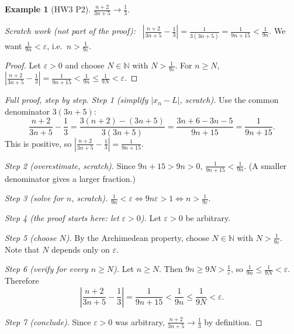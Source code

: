 \documentclass[11pt]{article}
\theoremstyle{definition}
\newtheorem{ex}[defn]{Example}
\newcommand{\N}{\mathbb{N}}
\newcommand{\eps}{\varepsilon}
\newenvironment{scratch}{\par\medskip\noindent\textit{Scratch work (not part of the proof):}\ }{\par\medskip}
\begin{document}
\begin{ex}[HW3 P2]
$\frac{n+2}{3n+5}\to\frac13$.
\begin{scratch}
$\left|\frac{n+2}{3n+5}-\frac13\right|=\frac{1}{3(3n+5)}=\frac1{9n+15}<\frac1{9n}$.
We want $\frac1{9n}<\eps$, i.e.\ $n>\frac1{9\eps}$.
\end{scratch}
\begin{proof}
Let $\eps>0$ and choose $N\in\N$ with $N>\frac{1}{9\eps}$. For $n\ge N$,
$\left|\frac{n+2}{3n+5}-\frac13\right|=\frac1{9n+15}<\frac1{9n}\le\frac1{9N}<\eps$.
\end{proof}

\begin{proof}[Full proof, step by step]
\emph{Step 1 (simplify $|x_n-L|$, scratch).} Use the common denominator
$3(3n+5)$:
\[
\frac{n+2}{3n+5}-\frac13=\frac{3(n+2)-(3n+5)}{3(3n+5)}=\frac{3n+6-3n-5}{9n+15}
=\frac1{9n+15}.
\]
This is positive, so $\left|\frac{n+2}{3n+5}-\frac13\right|=\frac1{9n+15}$.

\emph{Step 2 (overestimate, scratch).} Since $9n+15>9n>0$,
$\frac1{9n+15}<\frac1{9n}$. (A smaller denominator gives a larger fraction.)

\emph{Step 3 (solve for $n$, scratch).}
$\frac1{9n}<\eps\iff9n\eps>1\iff n>\frac1{9\eps}$.

\emph{Step 4 (the proof starts here: let $\eps>0$).} Let $\eps>0$ be
arbitrary.

\emph{Step 5 (choose $N$).} By the Archimedean property, choose
$N\in\N$ with $N>\frac1{9\eps}$. Note that $N$ depends only on $\eps$.

\emph{Step 6 (verify for every $n\ge N$).} Let $n\ge N$. Then
$9n\ge9N>\frac1\eps$, so $\frac1{9n}\le\frac1{9N}<\eps$. Therefore
\[
\left|\frac{n+2}{3n+5}-\frac13\right|=\frac1{9n+15}<\frac1{9n}\le\frac1{9N}<\eps.
\]

\emph{Step 7 (conclude).} Since $\eps>0$ was arbitrary,
$\frac{n+2}{3n+5}\to\frac13$ by definition.
\end{proof}
\end{ex}
\end{document}
